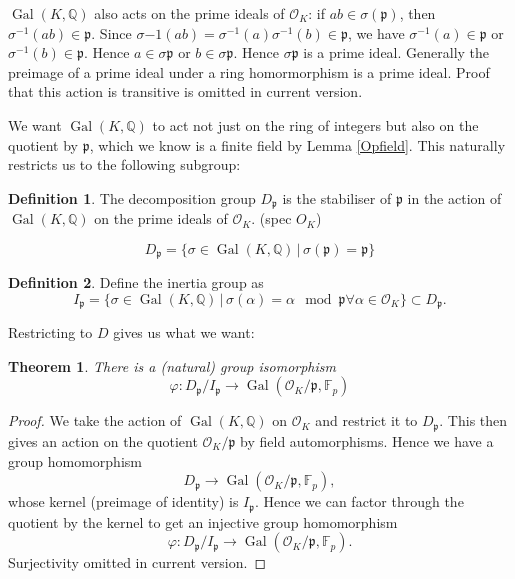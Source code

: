 \documentclass{article}
\newtheorem{thm}{Theorem}[section]
\theoremstyle{definition}
\newtheorem{definition}{Definition}[section]
\theoremstyle{definition}
\theoremstyle{definition}
\newcommand{\gal}{\operatorname{Gal}}
\newcommand{\Gal}{\operatorname{Gal}}
\newcommand{\Q}{\mathbb{Q}}
\newcommand{\F}{\mathbb{F}}
\begin{document}
$\Gal(K,\Q)$ also acts on the prime ideals of $\mathcal{O}_K$: if $ab\in\sigma(\mathfrak{p})$, then $\sigma^{-1}(ab)\in\mathfrak{p}$. Since $\sigma{-1}(ab)=\sigma^{-1}(a)\sigma^{-1}(b)\in\mathfrak{p}$, we have $\sigma^{-1}(a)\in\mathfrak{p}$ or $\sigma^{-1}(b)\in\mathfrak{p}$. Hence $a\in\sigma{\mathfrak p}$ or $b\in \sigma\mathfrak{p}$. Hence $\sigma{\mathfrak{p}}$ is a prime ideal. 
Generally the preimage of a prime ideal under a ring homormorphism is a prime ideal. Proof that this action is transitive is omitted in current version.

We want $\Gal(K,\Q)$ to act not just on the ring of integers but also on the quotient by $\mathfrak{p}$, which we know is a finite field by Lemma \ref{Opfield}. This naturally restricts us to the following subgroup:

\begin{definition} The decomposition group $D_{\mathfrak{p}}$ is the stabiliser of $\mathfrak{p}$ in the action of $\gal(K,\Q)$ on the prime ideals of $\mathcal{O}_K$. (spec $O_K$)

$$D_{\mathfrak{p}}=\{\sigma\in \Gal(K,\Q)\,|\, \sigma(\mathfrak{p})=\mathfrak{p}\}$$
    
\end{definition}
\begin{definition}
    
Define the inertia group as
$$I_{\mathfrak{p}}=\{\sigma\in \Gal(K,\Q)\,|\, \sigma(\alpha)=\alpha \mod \mathfrak{p} \forall \alpha\in\mathcal{O}_K\}\subset D_{\mathfrak{p}}.$$

\end{definition}

Restricting to $D$ gives us what we want:

\begin{thm}There is a (natural) group isomorphism
$$\varphi: D_{\mathfrak{p}}/I_{\mathfrak{p}}\to \Gal(\mathcal{O}_K/\mathfrak{p},\F_p)$$
   
\end{thm}

\begin{proof}
We take the action of $\Gal(K,\Q)$ on $\mathcal{O}_K$ and restrict it to $D_{\mathfrak{p}}$. This then gives an action on the quotient $\mathcal{O}_K/\mathfrak{p}$ by field automorphisms. Hence we have a group homomorphism
$$D_{\mathfrak{p}}\to \Gal(\mathcal{O}_K/\mathfrak{p},\F_p),$$
whose kernel (preimage of identity) is $I_{\mathfrak{p}}$. Hence we can factor through the quotient by the kernel to get an injective group homomorphism
$$\varphi: D_{\mathfrak{p}}/I_{\mathfrak{p}}\to \Gal(\mathcal{O}_K/\mathfrak{p},\F_p).$$
Surjectivity omitted in current version.
\end{proof}
\end{document}
